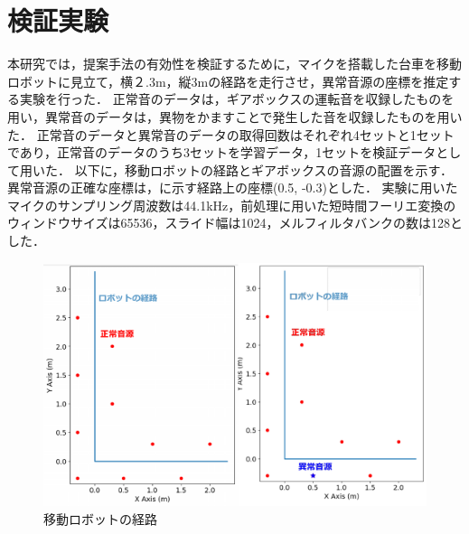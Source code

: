 \documentclass[../main]{subfiles}
\begin{document}
\graphicspath{{../figures/}}

\section{検証実験}
本研究では，提案手法の有効性を検証するために，マイクを搭載した台車を移動ロボットに見立て，横２.3m，縦3mの経路を走行させ，異常音源の座標を推定する実験を行った．
正常音のデータは，ギアボックスの運転音を収録したものを用い，異常音のデータは，異物をかますことで発生した音を収録したものを用いた．
正常音のデータと異常音のデータの取得回数はそれぞれ4セットと1セットであり，正常音のデータのうち3セットを学習データ，1セットを検証データとして用いた．
以下に，移動ロボットの経路とギアボックスの音源の配置を示す．
異常音源の正確な座標は，に示す経路上の座標(0.5, -0.3)とした．
実験に用いたマイクのサンプリング周波数は44.1kHz，前処理に用いた短時間フーリエ変換のウィンドウサイズは65536，スライド幅は1024，メルフィルタバンクの数は128とした．
\begin{figure}[tb]
  \centering
  \includegraphics[keepaspectratio, width=0.8\linewidth]{route.pdf}
  \caption{移動ロボットの経路}
\end{figure}
\end{document}
